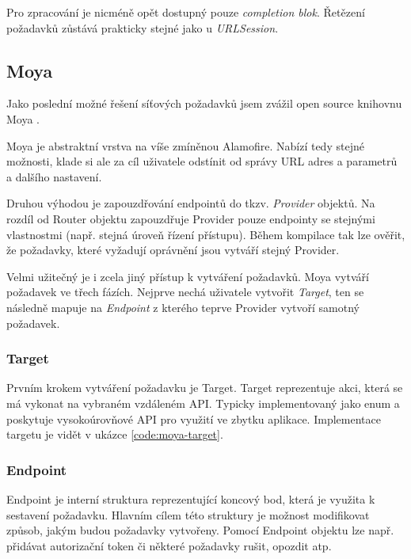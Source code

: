 Pro zpracování je nicméně opět dostupný pouze \textit{completion blok}.
Řetězení požadavků zůstává prakticky stejné jako u \textit{URLSession}.

\subsection{Moya}

Jako poslední možné řešení síťových požadavků jsem zvážil open source knihovnu Moya \cite{github-moya}.

Moya je abstraktní vrstva na víše zmíněnou Alamofire.
Nabízí tedy stejné možnosti, klade si ale za cíl uživatele odstínit od správy URL adres a parametrů a dalšího nastavení.

Druhou výhodou je zapouzdřování endpointů do tkzv. \textit{Provider} objektů.
Na rozdíl od Router objektu zapouzdřuje Provider pouze endpointy se stejnými vlastnostmi (např. stejná úroveň řízení přístupu).
Během kompilace tak lze ověřit, že požadavky, které vyžadují oprávnění jsou vytváří stejný Provider.

\medskip

Velmi užitečný je i zcela jiný přístup k vytváření požadavků.
Moya vytváří požadavek ve třech fázích.
Nejprve nechá uživatele vytvořit \textit{Target}, ten se následně mapuje na \textit{Endpoint} z kterého teprve Provider vytvoří samotný požadavek.

\subsubsection{Target}

Prvním krokem vytváření požadavku je Target.
Target reprezentuje akci, která se má vykonat na vybraném vzdáleném API.
Typicky implementovaný jako enum a poskytuje vysokoúrovňové API pro využití ve zbytku aplikace.
Implementace targetu je vidět v ukázce \ref{code:moya-target}.


\subsubsection{Endpoint}

Endpoint je interní struktura reprezentující koncový bod, která je využita k sestavení požadavku.
Hlavním cílem této struktury je možnost modifikovat způsob, jakým budou požadavky vytvořeny.
Pomocí Endpoint objektu lze např. přidávat autorizační token či některé požadavky rušit, opozdit atp.

